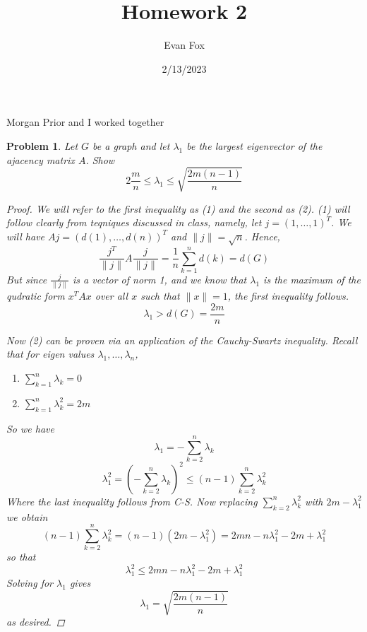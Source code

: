 \documentclass{article} \usepackage{amsmath, amsthm, hyperref}
\title{Homework 2}
\author{Evan Fox}
\date{2/13/2023}
\newtheorem{prb}{Problem}
\begin{document}
 
\maketitle
Morgan Prior and I worked together
\begin{prb} 
Let $G$ be a graph and let $\lambda_1$ be the largest eigenvector of the ajacency matrix $A$. Show 
\[ 2\frac{m}{n} \leq  \lambda_1 \leq \sqrt{\frac{2m(n-1)}{n}} \] 

\begin{proof} 
We will refer to the first inequality as (1) and the second as (2). (1) will follow clearly from teqniques discussed in class, 
namely, let $j = (1, \dots, 1)^T$. We will have $Aj = (d(1), \dots, d(n))^T$ and $\|j\| =\sqrt{n} $. Hence,  
\begin{equation*} 
	\frac{j^T}{\|j\|} A \frac{j}{\|j\|} = \frac{1}{n} \sum_{k = 1}^n d(k) = d(G)
\end{equation*} 
But since $\frac{j}{\|j\|}$ is a vector of norm 1, and we know that $\lambda_1$ is the maximum of the qudratic form $x^T A x$ over all $x$ such that $\|x\| = 1$, 
the first inequality follows.
\[ \lambda_1 > d(G) = \frac{2m}{n} \] 

Now (2) can be proven via an application of the Cauchy-Swartz inequality. Recall that for eigen values $\lambda_1, \dots, \lambda_n$,
\begin{enumerate} 
	\item $\sum_{k = 1}^n \lambda_k = 0$ 
	\item $\sum_{k = 1}^n \lambda_k^2 = 2m$
\end{enumerate}
So we have 
\[ \lambda_1 = -\sum_{k = 2}^n \lambda_k \] 
\[ \lambda_1^2 = \left(-\sum_{k = 2}^n \lambda_k \right)^2 \leq (n-1)\sum_{k=2}^n \lambda_k^2\]
Where the last inequality follows from C-S. Now replacing $\sum_{k=2}^n \lambda_k^2$ with $2m - \lambda_1^2$ we obtain 
\[(n-1)\sum_{k=2}^n \lambda_k^2 = (n-1)(2m - \lambda_1^2) = 2mn - n\lambda_1^2 - 2m + \lambda_1^2 \] 
so that 
\[\lambda_1^2 \leq 2mn - n\lambda_1^2 - 2m + \lambda_1^2 \] 
Solving for $\lambda_1$ gives 
\[\lambda_1 = \sqrt{\frac{2m(n-1)}{n}} \] 
as desired. 

\end{proof}
\end{prb}
\end{document}

